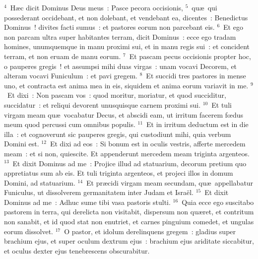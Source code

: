 ${}^{4}$~H\ae c dicit Dominus Deus meus~: Pasce pecora occisionis,
${}^{5}$~qu\ae\ qui possederant occidebant, et non dolebant, et vendebant ea, dicentes~: Benedictus Dominus~! divites facti sumus~: et pastores eorum non parcebant eis.
${}^{6}$~Et ego non parcam ultra super habitantes terram, dicit Dominus~: ecce ego tradam homines, unumquemque in manu proximi sui, et in manu regis sui~: et concident terram, et non eruam de manu eorum.
${}^{7}$~Et pascam pecus occisionis propter hoc, o pauperes gregis~! et assumpsi mihi duas virgas~: unam vocavi Decorem, et alteram vocavi Funiculum~: et pavi gregem.
${}^{8}$~Et succidi tres pastores in mense uno, et contracta est anima mea in eis, siquidem et anima eorum variavit in me.
${}^{9}$~Et dixi~: Non pascam vos~: quod moritur, moriatur, et quod succiditur, succidatur~: et reliqui devorent unusquisque carnem proximi sui.
${}^{10}$~Et tuli virgam meam qu\ae\ vocabatur Decus, et abscidi eam, ut irritum facerem fœdus meum quod percussi cum omnibus populis.
${}^{11}$~Et in irritum deductum est in die illa~: et cognoverunt sic pauperes gregis, qui custodiunt mihi, quia verbum Domini est.
${}^{12}$~Et dixi ad eos~: Si bonum est in oculis vestris, afferte mercedem meam~: et si non, quiescite. Et appenderunt mercedem meam triginta argenteos.
${}^{13}$~Et dixit Dominus ad me~: Projice illud ad statuarium, decorum pretium quo appretiatus sum ab eis. Et tuli triginta argenteos, et projeci illos in domum Domini, ad statuarium.
${}^{14}$~Et pr\ae cidi virgam meam secundam, qu\ae\ appellabatur Funiculus, ut dissolverem germanitatem inter Judam et Isra\"el.
${}^{15}$~Et dixit Dominus ad me~: Adhuc sume tibi vasa pastoris stulti.
${}^{16}$~Quia ecce ego suscitabo pastorem in terra, qui derelicta non visitabit, dispersum non qu\ae ret, et contritum non sanabit, et id quod stat non enutriet, et carnes pinguium comedet, et ungulas eorum dissolvet.
${}^{17}$~O pastor, et idolum derelinquens gregem~: gladius super brachium ejus, et super oculum dextrum ejus~: brachium ejus ariditate siccabitur, et oculus dexter ejus tenebrescens obscurabitur.
